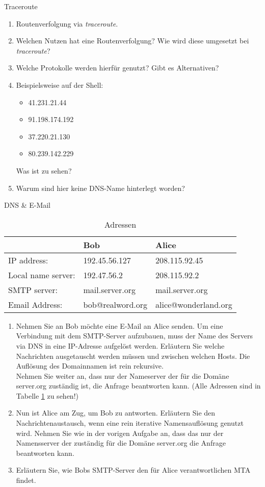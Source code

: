 \documentclass[a4paper,twoside,12pt]{article}
\newcounter{AUFGNR}
\newcommand{\AUFGABE}[2]{\vspace{0.3cm}\item[Exercise \arabic{AUFGNR}]\stepcounter{AUFGNR} #1\hfill\emph{#2}}
\begin{document}
\begin{description}
\AUFGABE{Traceroute}{}
\begin{enumerate}
	\item Routenverfolgung via \emph{traceroute}.
	\item Welchen Nutzen hat eine Routenverfolgung? Wie wird diese umgesetzt bei \emph{traceroute}?
	\item Welche Protokolle werden hierfür genutzt? Gibt es Alternativen?
	\item Beispielsweise auf der Shell:
	\begin{itemize}
		\item 41.231.21.44
		\item 91.198.174.192
		\item 37.220.21.130
		\item 80.239.142.229
	\end{itemize}
	Was ist zu sehen?
	\item Warum sind hier keine DNS-Name hinterlegt worden?
\end{enumerate}

\AUFGABE{DNS \& E-Mail}{}
\begin{table}[h]
\caption{Adressen}
\label{dns_mail}
\centering
\begin{tabular}{lll}
\hline
 & Bob & Alice \\ \hline
 IP address: &  192.45.56.127 & 208.115.92.45\\
 Local name server:& 192.47.56.2 & 208.115.92.2\\
 SMTP server: & mail.server.org & mail.server.org\\
 Email Address: & bob@realword.org & alice@wonderland.org\\ \hline
\end{tabular}
\end{table}
\begin{enumerate}
	\item Nehmen Sie an Bob möchte eine E-Mail an Alice senden. Um eine Verbindung mit dem SMTP-Server aufzubauen, muss der Name des Servers via DNS in eine IP-Adresse aufgelöst werden. Erläutern Sie welche Nachrichten ausgetauscht werden müssen und zwischen welchen Hosts. Die Auflösung des Domainnamen ist rein rekursive.\\
		Nehmen Sie weiter an, dass nur der Nameserver der für die Domäne server.org zuständig ist, die Anfrage beantworten kann. (Alle Adressen sind in Tabelle \ref{dns_mail} zu sehen!)
	\item Nun ist Alice am Zug, um Bob zu antworten. Erläutern Sie den Nachrichtenaustausch, wenn eine rein iterative Namensauflösung genutzt wird. Nehmen Sie wie in der vorigen Aufgabe an, dass das nur der Namensserver der zuständig für die Domäne server.org die Anfrage beantworten kann.
	\item Erläutern Sie, wie Bobs SMTP-Server den für Alice verantwortlichen MTA findet.
\end{enumerate}


\end{description}
\end{document}
